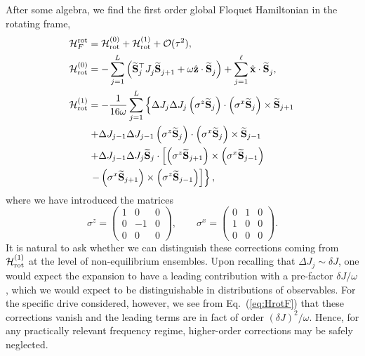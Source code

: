 \documentclass[aps,pre,twocolumn,notitlepage,floats,10pt]{revtex4-1}
\def\ptop{{\vphantom\top}}
\newcommand{\be}{\begin{equation}}
\newcommand{\ee}{\end{equation}}
\newcommand{\beA}{\begin{equation}\begin{aligned}}
\newcommand{\eeA}{\end{aligned}\end{equation}}
\begin{document}
After some algebra, we find the first order global Floquet Hamiltonian in the
rotating frame,
\beA
\mathcal{H}_{F}^{\rm rot} &=
\mathcal{H}_{\rm rot}^{(0)} + \mathcal{H}_{\rm rot}^{(1)} + \mathcal{O}(\tau^2) ,\\
\mathcal{H}_{\rm rot}^{(0)} &=
- \sum_{j=1}^L \left( \widetilde{\bf S}_j^\top J_j^\ptop \widetilde{\bf S}_{j+1}^\ptop + \omega\hat{\bf z}\cdot \widetilde{\bf S}_j^\ptop \right)
+ \sum_{j=1}^\ell \hat{\bf x}\cdot \widetilde{\bf S}_j^\ptop,\\
\mathcal{H}_{\rm rot}^{(1)}
&=
- \frac{1}{16\omega}
\sum_{j=1}^L
\left\{
\Delta J_j \Delta J_j
\left( \sigma^z \widetilde{\bf S}_j \right)
\cdot \left( \sigma^x \widetilde{\bf S}_j \right)
\times \widetilde{\bf S}_{j+1}
\right.
\\
& \left.  +
\Delta J_{j-1} \Delta J_{j-1}
\left( \sigma^z \widetilde{\bf S}_j \right)
\cdot \left( \sigma^x \widetilde{\bf S}_j \right)
\times \widetilde{\bf S}_{j-1}
\right. \\
&\left.+
\Delta J_{j-1} \Delta J_j
\widetilde{\bf S}_j \cdot
\left[
  \left( \sigma^z \widetilde{\bf S}_{j+1} \right) \times \left( \sigma^x \widetilde{\bf S}_{j-1} \right)
  \right.\right.
  \\
  & \left.\left.
  -
  \left( \sigma^x \widetilde{\bf S}_{j+1} \right) \times \left( \sigma^z \widetilde{\bf S}_{j-1} \right)
  \right]
\right\},
\label{eq:HrotF}
\eeA
where we have introduced the matrices
\be
\sigma^z = \begin{pmatrix} 1 & 0 & 0 \\ 0 & -1 & 0 \\ 0 & 0 & 0 \end{pmatrix}
,\qquad
\sigma^x = \begin{pmatrix} 0 & 1 & 0 \\ 1 & 0 & 0 \\ 0 & 0 & 0 \end{pmatrix}
.
\ee
It is natural to ask whether we can distinguish these corrections coming from
$\mathcal{H}_{\rm rot}^{(1)}$ at the level of non-equilibrium ensembles.
Upon recalling that $\Delta J_j \sim \delta J$, one would expect the expansion
to have a leading contribution with a pre-factor $\delta J/\omega$, which we
would expect to be distinguishable in distributions of observables.
For the specific drive considered, however, we see from Eq.~(\ref{eq:HrotF})
that these corrections vanish and the leading terms are in fact of order
$(\delta J)^2/\omega$.
Hence, for any practically relevant frequency regime, higher-order corrections
may be safely neglected.
\end{document}
